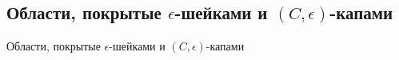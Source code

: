 \subsection{\texorpdfstring{Области, покрытые $\epsilon$-шейками и $(C,\epsilon)$-капами}{Области, покрытые ϵ-шейками и (C,ϵ)-капами}}
Области, покрытые $\epsilon$-шейками и $(C,\epsilon)$-капами